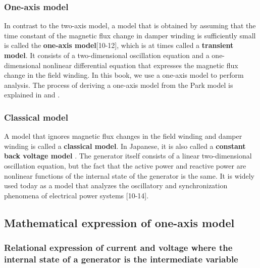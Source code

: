 \documentclass[graybox, envcountchap]{svmult}
\begin{document}
\smallskip
\subsubsection{One-axis model}

In contrast to the two-axis model, a model that is obtained by assuming that the time constant of the magnetic flux change in damper winding is 
sufficiently small is called the \textbf{one-axis model}[10-12], which is at times called a \textbf{transient model}.
It consists of a two-dimensional oscillation equation and a one-dimensional nonlinear differential equation that expresses the magnetic flux change in the field winding.
In this book, we use a one-axis model to perform analysis.
The process of deriving a one-axis model from the Park model is explained in \cite[Section 5]{sauer2017power} and \cite[Section 4.15]{anderson2008power}.

\smallskip
\subsubsection{Classical model }

A model that ignores magnetic flux changes in the field winding and damper winding is called a \textbf{classical model}.
In Japanese, it is also called a \textbf{constant back voltage model} \cite{kato2017electric}. 
The generator itself consists of a linear two-dimensional oscillation equation, but the fact that the active power and reactive power are nonlinear functions of the internal state of the generator is the same.
It is widely used today as a model that analyzes the oscillatory and synchronization phenomena of electrical power systems [10-14].

\subsection{Mathematical expression of one-axis model}\label{sec:genfund}

\smallskip
\subsubsection{Relational expression of current and voltage where the internal state of a generator is the intermediate variable}
\end{document}
